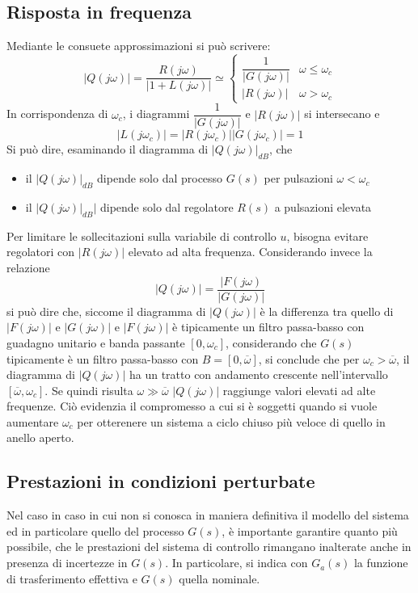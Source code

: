 \documentclass[a4paper]{report}
\begin{document}
\subsection{Risposta in frequenza}
Mediante le consuete approssimazioni si pu\`o scrivere:
\[
|Q(j \omega)| = \dfrac{R(j \omega)}{|1 + L(j \omega)|} \simeq
\left \{
\begin{array}{ll}
  \dfrac{1}{|G(j \omega)|} & \omega \leq \omega_c\\
  |R(j \omega)| & \omega > \omega_c
\end{array}
\right .
\]
In corrispondenza di $\omega_c$, i diagrammi $\dfrac{1}{|G(j
  \omega)|}$ e $|R(j \omega)|$ si intersecano e
\[
|L(j \omega_c)| = |R(j \omega_c)| |G(j \omega_c)| = 1
\]
Si pu\`o dire, esaminando il diagramma di $|Q(j \omega)|_{dB}$, che
\begin{itemize}
\item il $|Q(j \omega)|_{dB}$ dipende solo dal processo $G(s)$ per
  pulsazioni $\omega < \omega_c$
\item il $|Q(j \omega)|_{dB}|$ dipende solo dal regolatore $R(s)$ a
  pulsazioni elevata
\end{itemize}
Per limitare le sollecitazioni sulla variabile di controllo $u$,
bisogna evitare regolatori con $|R(j \omega)|$ elevato ad alta
frequenza. Considerando invece la relazione
\[
|Q(j \omega)| = \dfrac{|F(j \omega)}{|G(j \omega)|}
\]
si pu\`o dire che, siccome il diagramma di $|Q(j \omega)|$ \`e la
differenza tra quello di $|F(j \omega)|$ e $|G(j \omega)|$ e $|F(j
\omega)|$ \`e tipicamente un filtro passa-basso con guadagno unitario
e banda passante $[0, \omega_c]$, considerando che $G(s)$ tipicamente
\`e un filtro passa-basso con $B = [0, \overline{\omega}]$, si
conclude che per $\omega_c > \overline{\omega}$, il diagramma di $|Q(j
\omega)|$ ha un tratto con andamento crescente nell'intervallo
$[\overline{\omega}, \omega_c]$. Se quindi risulta $\omega \gg
\overline{\omega}$ $|Q(j \omega)|$ raggiunge valori elevati ad alte
frequenze. Ci\`o evidenzia il compromesso a cui si \`e soggetti quando
si vuole aumentare $\omega_c$ per otterenere un sistema a ciclo chiuso
pi\`u veloce di quello in anello aperto.
\subsection{Prestazioni in condizioni perturbate}
Nel caso in caso in cui non si conosca in maniera definitiva il
modello del sistema ed in particolare quello del processo $G(s)$, \`e
importante garantire quanto pi\`u possibile, che le prestazioni del
sistema di controllo rimangano inalterate anche in presenza di
incertezze in $G(s)$. In particolare, si indica con $G_a(s)$ la
funzione di trasferimento effettiva e $G(s)$ quella nominale.
\end{document}
